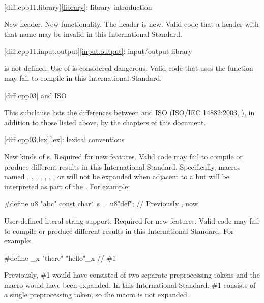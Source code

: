 [diff.cpp11.library]{\ref{library}: library introduction}

\change
New header.
\rationale
New functionality.
\effect
The \Cpp{} header  is new.
Valid \CppXI{} code that  a header with that name may be
invalid in this International Standard.

[diff.cpp11.input.output]{\ref{input.output}: input/output library}

\change
{} is not defined.
\rationale
Use of  is considered dangerous.
\effect
Valid \CppXI{} code that uses the  function may fail to compile
in this International Standard.

[diff.cpp03]{\Cpp{} and ISO \CppIII{}}

\pnum
{}%
This subclause lists the differences between \Cpp{} and
ISO \CppIII{} (ISO/IEC 14882:2003, ),
in addition to those listed above,
by the chapters of this document.

[diff.cpp03.lex]{\ref{lex}: lexical conventions}

\change
New kinds of s.
\rationale
Required for new features.
\effect
Valid \CppIII{} code may fail to compile or produce different results in
this International Standard. Specifically, macros named , ,
, , , , , or  will
not be expanded when adjacent to a  but will be interpreted as
part of the . For example:
\begin{codeblock}
#define u8 "abc"
const char* s = u8"def";        // Previously , now 
\end{codeblock}

\change
User-defined literal string support.
\rationale
Required for new features.
\effect
Valid \CppIII{} code may fail to compile or produce different results in
this International Standard.
For example:
\begin{codeblock}
#define _x "there"
"hello"_x           // \#1
\end{codeblock}

Previously, \#1 would have consisted of two separate preprocessing tokens and
the macro  would have been expanded. In this International Standard,
\#1 consists of a single preprocessing token, so the macro is not expanded.

